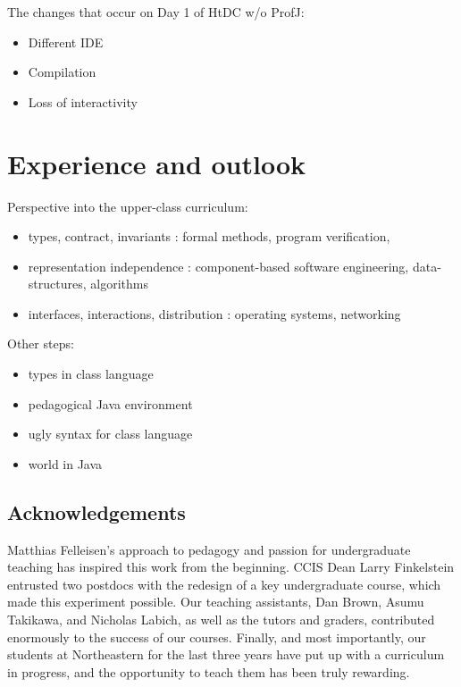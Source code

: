 \documentclass[submission,copyright]{eptcs}
\begin{document}
The changes that occur on Day 1 of HtDC w/o ProfJ:

\begin{itemize}
\item Different IDE
\item Compilation
\item Loss of interactivity
\end{itemize}

\section{Experience and outlook}
\label{sec:conclusion}

Perspective into the upper-class curriculum:

\begin{itemize}
\item types, contract, invariants : formal methods, program verification,
  
\item representation independence : component-based software engineering,
  data-structures, algorithms

\item interfaces, interactions, distribution : operating systems, networking
\end{itemize}


Other steps:
\begin{itemize}
\item types in class language
\item pedagogical Java environment
\item ugly syntax for class language
\item world in Java
\end{itemize}

\cite{dvanhorn:sicp}

\cite{local:htdc}

\subsection*{Acknowledgements}

Matthias Felleisen's approach to pedagogy and passion for
undergraduate teaching has inspired this work from the beginning.
CCIS Dean Larry Finkelstein entrusted two postdocs with the redesign
of a key undergraduate course, which made this experiment possible.
Our teaching assistants, Dan Brown, Asumu Takikawa, and Nicholas
Labich, as well as the tutors and graders, contributed enormously to
the success of our courses. Finally, and most importantly, our
students at Northeastern for the last three years have put up with a
curriculum in progress, and the opportunity to teach them has been
truly rewarding.



\end{document}
